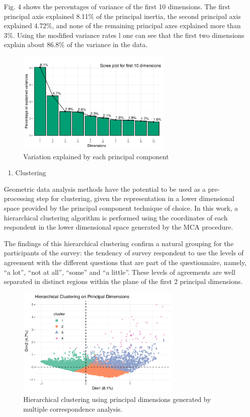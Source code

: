 \documentclass[]{article}
\providecommand{\tightlist}{%
  \setlength{\itemsep}{0pt}\setlength{\parskip}{0pt}}
\begin{document}
Fig. 4 shows the percentages of variance of the first 10 dimensions. The
first principal axis explained 8.11\% of the principal inertia, the
second principal axis explained 4.72\%, and none of the remaining
principal axes explained more than 3\%. Using the modified variance
rates l one can see that the first two dimensions explain about 86.8\%
of the variance in the data.

\begin{figure}[!ht] 
\centering 
\includegraphics[width=3in]{../figs/screeplot.pdf}
\caption{Variation explained by each principal component}
\label{fig:screeplot} 
\end{figure}

\begin{enumerate}
\def\labelenumi{\arabic{enumi}.}
\tightlist
\item
  Clustering
\end{enumerate}

Geometric data analysis methods have the potential to be used as a
pre-processing step for clustering, given the representation in a lower
dimensional space provided by the principal component technique of
choice. In this work, a hierarchical clustering algorithm is performed
using the coordinates of each respondent in the lower dimensional space
generated by the MCA procedure.

The findings of this hierarchical clustering confirm a natural grouping
for the participants of the survey: the tendency of survey respondent to
use the levels of agreement with the different questions that are part
of the questionnaire, namely, ``a lot'', ``not at all'', ``some'' and
``a little''. These levels of agreements are well separated in distinct
regions within the plane of the first 2 principal dimensions.

\begin{figure}[h!] 
\centering 
\includegraphics[width=3.2in]{../figs/new_hclust.pdf}
\caption{Hierarchical clustering using principal dimensions generated by multiple correspondence analysis.}
\label{fig:hclust} 
\end{figure}
\end{document}

